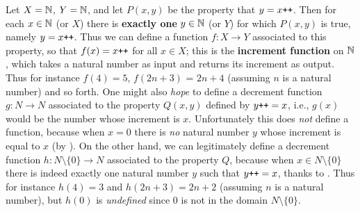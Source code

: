 \begin{example} \label{example 3.3.2}
Let \(X = \mathbb{N}\), \(Y = \mathbb{N}\), and let \(P(x, y)\) be the property that \(y = x\texttt{++}\). Then for each \(x \in \mathbb{N}\) (or \(X\)) there is \textbf{exactly one} \(y \in \mathbb{N}\) (or \(Y\)) for which \(P(x, y)\) is true, namely \(y = x\texttt{++}\). Thus we can define a function \(f : X \longrightarrow Y\) associated to this property, so that \(f(x)= x\texttt{++}\) for all \(x \in X\); this is the \textbf{increment function} on \(\mathbb{N}\), which takes a natural number as input and returns its increment as output. Thus for instance \(f(4) = 5\), \(f(2n + 3)\) = \(2n + 4\) (assuming \(n\) is a natural number) and so forth. One might also \emph{hope} to define a decrement function \(g : N \longrightarrow N\) associated to the property \(Q(x, y)\) defined by \(y\texttt{++} = x\), i.e., \(g(x)\) would be the number whose increment is \(x\). Unfortunately this does \emph{not} define a function, because when \(x = 0\) there is \emph{no} natural number \(y\) whose increment is equal to \(x\) (by ). On the other hand, we can legitimately define a decrement function \(h : N \setminus \{0\} \longrightarrow N\) associated to the property \(Q\), because when \(x \in N \setminus \{0\}\) there is indeed exactly one natural number \(y\) such that \(y\texttt{++} = x\), thanks to . Thus for instance \(h(4) = 3\) and \(h(2n +3) = 2n + 2\) (assuming \(n\) is a natural number), but \(h(0)\) is \emph{undefined} since \(0\) is not in the domain \(N \setminus \{0\}\).
\end{example}
